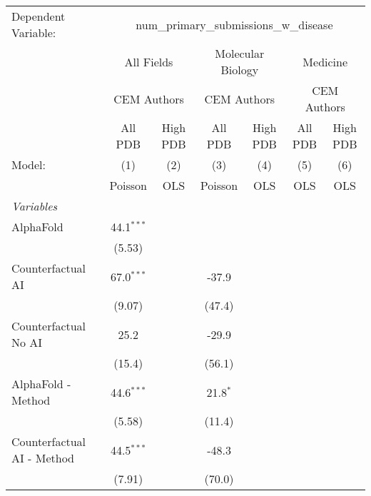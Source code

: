 \begingroup
\centering
\begin{tabular}{lcccccc}
   \tabularnewline \midrule \midrule
   Dependent Variable: & \multicolumn{6}{c}{num\_primary\_submissions\_w\_disease}\\
 & \multicolumn{2}{c}{All Fields} & \multicolumn{2}{c}{Molecular Biology} & \multicolumn{2}{c}{Medicine} \\
\cmidrule(lr){2-3} \cmidrule(lr){4-5} \cmidrule(lr){6-7}
 & \multicolumn{2}{c}{CEM Authors} & \multicolumn{2}{c}{CEM Authors} & \multicolumn{2}{c}{CEM Authors} \\
\cmidrule(lr){2-3} \cmidrule(lr){4-5} \cmidrule(lr){6-7}
 & \multicolumn{1}{c}{All PDB} & \multicolumn{1}{c}{High PDB} & \multicolumn{1}{c}{All PDB} & \multicolumn{1}{c}{High PDB} & \multicolumn{1}{c}{All PDB} & \multicolumn{1}{c}{High PDB} \\
\cmidrule(lr){2-2} \cmidrule(lr){3-3} \cmidrule(lr){4-4} \cmidrule(lr){5-5} \cmidrule(lr){6-6} \cmidrule(lr){7-7}
   Model:                        & (1)          & (2)  & (3)        & (4)  & (5)  & (6)\\  
                                 &  Poisson     & OLS  & Poisson    & OLS  & OLS  & OLS\\  
   \midrule
   \emph{Variables}\\
   AlphaFold                     & 44.1$^{***}$ &      &            &      &      &   \\   
                                 & (5.53)       &      &            &      &      &   \\   
   Counterfactual AI             & 67.0$^{***}$ &      & -37.9      &      &      &   \\   
                                 & (9.07)       &      & (47.4)     &      &      &   \\   
   Counterfactual No AI          & 25.2         &      & -29.9      &      &      &   \\   
                                 & (15.4)       &      & (56.1)     &      &      &   \\   
   AlphaFold - Method            & 44.6$^{***}$ &      & 21.8$^{*}$ &      &      &   \\   
                                 & (5.58)       &      & (11.4)     &      &      &   \\   
   Counterfactual AI - Method    & 44.5$^{***}$ &      & -48.3      &      &      &   \\   
                                 & (7.91)       &      & (70.0)     &      &      &   \\   

\end{tabular}
